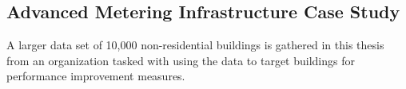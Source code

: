 \subsection{Advanced Metering Infrastructure Case Study}
\label{sec:smartmeterdata}

A larger data set of 10,000 non-residential buildings is gathered in this thesis from an organization tasked with using the data to target buildings for performance improvement measures.